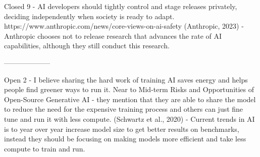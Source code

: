 Closed 9 - AI developers should tightly control and stage releases privately, deciding independently when society is ready to adapt.
https://www.anthropic.com/news/core-views-on-ai-safety
(Anthropic, 2023)
\citep{anthropic_core_2023} - Anthropic chooses not to release research that advances the rate of AI capabilities, although they still conduct this research.

--------------------

Open 2 - I believe sharing the hard work of training AI saves energy and helps people find greener ways to run it.
Near to Mid-term Risks and Opportunities of Open-Source Generative AI
\citep{touvron_llama_2023} - they mention that they are able to share the model to reduce the need for the expensive training process and others can just fine tune and run it with less compute.
(Schwartz et al., 2020)
\citep{schwartz_green_2019} - Current trends in AI is to year over year increase model size to get better results on benchmarks, instead they should be focusing on making models more efficient and take less compute to train and run.